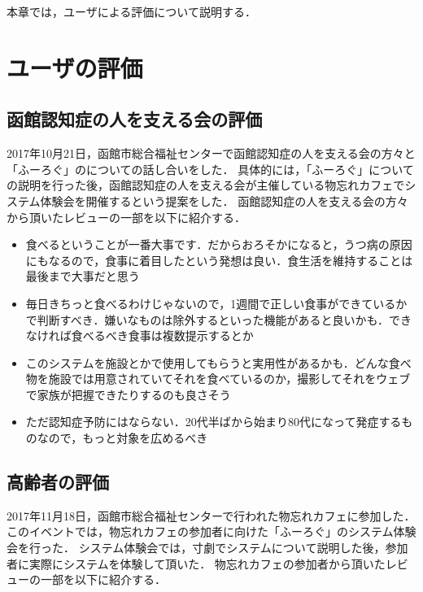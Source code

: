 \documentclass[../report]{subfiles}
\begin{document}
本章では，ユーザによる評価について説明する．

\section{ユーザの評価}
\subsection{函館認知症の人を支える会の評価} \label{sec:7_hyouka_monowasurecafe}
2017年10月21日，函館市総合福祉センターで函館認知症の人を支える会の方々と「ふーろぐ」のについての話し合いをした．
具体的には，「ふーろぐ」についての説明を行った後，函館認知症の人を支える会が主催している物忘れカフェでシステム体験会を開催するという提案をした．
函館認知症の人を支える会の方々から頂いたレビューの一部を以下に紹介する．

\begin{itemize}
    \item 食べるということが一番大事です．だからおろそかになると，うつ病の原因にもなるので，食事に着目したという発想は良い．食生活を維持することは最後まで大事だと思う
    \item 毎日きちっと食べるわけじゃないので，1週間で正しい食事ができているかで判断すべき．嫌いなものは除外するといった機能があると良いかも．できなければ食べるべき食事は複数提示するとか
    \item このシステムを施設とかで使用してもらうと実用性があるかも．どんな食べ物を施設では用意されていてそれを食べているのか，撮影してそれをウェブで家族が把握できたりするのも良さそう
    \item ただ認知症予防にはならない．20代半ばから始まり80代になって発症するものなので，もっと対象を広めるべき
\end{itemize}

\subsection{高齢者の評価}
2017年11月18日，函館市総合福祉センターで行われた物忘れカフェに参加した．
このイベントでは，物忘れカフェの参加者に向けた「ふーろぐ」のシステム体験会を行った．
システム体験会では，寸劇でシステムについて説明した後，参加者に実際にシステムを体験して頂いた．
物忘れカフェの参加者から頂いたレビューの一部を以下に紹介する．
\end{document}
